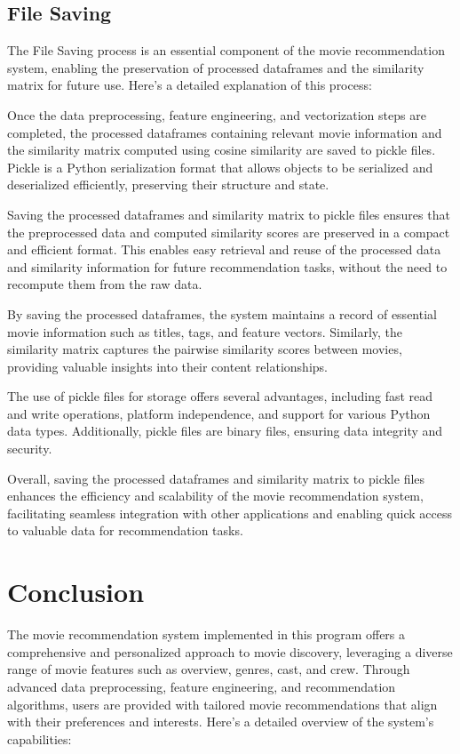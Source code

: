 \documentclass{article}
\begin{document}
\subsection{File Saving}
The File Saving process is an essential component of the movie recommendation system, enabling the preservation of processed dataframes and the similarity matrix for future use. Here's a detailed explanation of this process:

Once the data preprocessing, feature engineering, and vectorization steps are completed, the processed dataframes containing relevant movie information and the similarity matrix computed using cosine similarity are saved to pickle files. Pickle is a Python serialization format that allows objects to be serialized and deserialized efficiently, preserving their structure and state.

Saving the processed dataframes and similarity matrix to pickle files ensures that the preprocessed data and computed similarity scores are preserved in a compact and efficient format. This enables easy retrieval and reuse of the processed data and similarity information for future recommendation tasks, without the need to recompute them from the raw data.

By saving the processed dataframes, the system maintains a record of essential movie information such as titles, tags, and feature vectors. Similarly, the similarity matrix captures the pairwise similarity scores between movies, providing valuable insights into their content relationships.

The use of pickle files for storage offers several advantages, including fast read and write operations, platform independence, and support for various Python data types. Additionally, pickle files are binary files, ensuring data integrity and security.

Overall, saving the processed dataframes and similarity matrix to pickle files enhances the efficiency and scalability of the movie recommendation system, facilitating seamless integration with other applications and enabling quick access to valuable data for recommendation tasks.


\section{Conclusion}
The movie recommendation system implemented in this program offers a comprehensive and personalized approach to movie discovery, leveraging a diverse range of movie features such as overview, genres, cast, and crew. Through advanced data preprocessing, feature engineering, and recommendation algorithms, users are provided with tailored movie recommendations that align with their preferences and interests. Here's a detailed overview of the system's capabilities:
\end{document}
